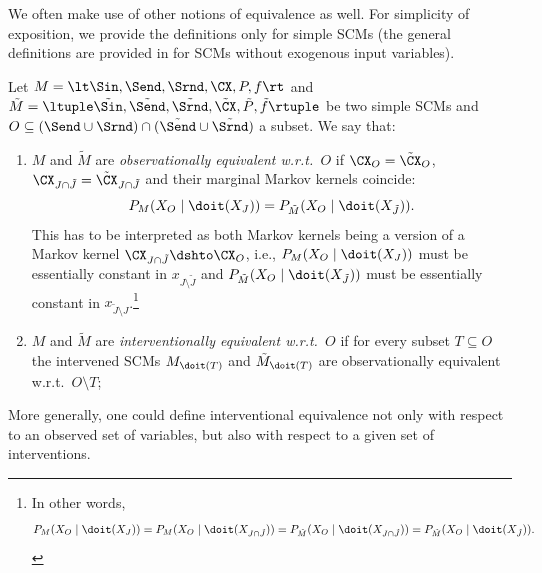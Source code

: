 We often make use of other notions of equivalence as well.
For simplicity of exposition, we provide the definitions only for simple SCMs 
(the general definitions are provided in \cite{BFPM21} for SCMs without exogenous input variables).
\begin{Def}\label{def:scm_obs_interv_equiv}
  Let $M = \lt \Sin, \Send, \Srnd, \CX, P, f \rt$ and
  $\tilde{M} = \ltuple \tilde{\Sin}, \tilde{\Send}, \tilde{\Srnd}, \tilde{\CX}, \tilde{P}, \tilde{f} \rtuple$ be two simple SCMs
  and $O \subseteq (\Send \cup \Srnd) \cap (\tilde{\Send} \cup \tilde{\Srnd})$ a subset.
  We say that:
  \begin{enumerate}
    \item $M$ and $\tilde{M}$ are \emph{observationally equivalent w.r.t.\ $O$} if $\CX_O = \tilde{\CX}_O$, $\CX_{J \cap \tilde{J}} = \tilde{\CX}_{J \cap \tilde{J}}$ and their marginal Markov kernels coincide: 
      $$P_{M}(X_O \mid \doit(X_J)) = P_{\tilde{M}}(X_O \mid \doit(X_{\tilde J})).$$
    This has to be interpreted as both Markov kernels being a version of a Markov kernel $\CX_{J \cap \tilde{J}} \dshto \CX_O$,
    i.e., $P_{M}(X_O \mid \doit(X_J))$ must be essentially constant in $x_{J \setminus \tilde{J}}$ and
    $P_{\tilde{M}}(X_O \mid \doit(X_{\tilde{J}}))$ must be essentially constant in $x_{\tilde{J} \setminus J}$.\footnote{In other words,
      $$P_{M}(X_O \mid \doit(X_J)) = P_{M}(X_O \mid \doit(X_{J \cap \tilde{J}})) =
      P_{\tilde{M}}(X_O \mid \doit(X_{J \cap \tilde{J}})) = P_{\tilde{M}}(X_O \mid \doit(X_{\tilde{J}})).$$}
    \item $M$ and $\tilde{M}$ are \emph{interventionally equivalent w.r.t.\ $O$} if for every subset $T \subseteq O$ the intervened SCMs $M_{\doit(T)}$ and $\tilde{M}_{\doit(T)}$ are observationally equivalent w.r.t.\ $O \setminus T$;
  \end{enumerate}
\end{Def}
More generally, one could define interventional equivalence not only with respect to an observed set of variables, but also with respect to a given set of interventions.

